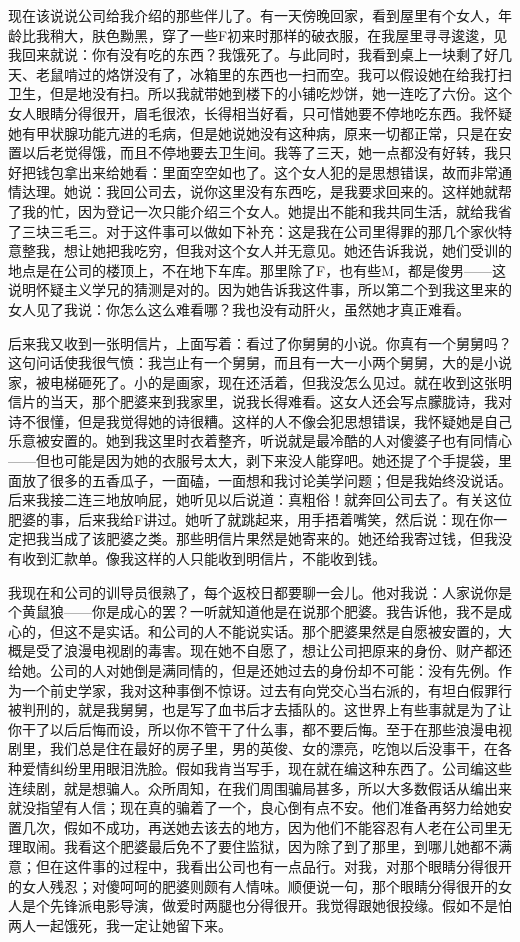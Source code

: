 现在该说说公司给我介绍的那些伴儿了。有一天傍晚回家，看到屋里有个女人，年龄比我稍大，肤色黝黑，穿了一些F初来时那样的破衣服，在我屋里寻寻逡逡，见我回来就说：你有没有吃的东西？我饿死了。与此同时，我看到桌上一块剩了好几天、老鼠啃过的烙饼没有了，冰箱里的东西也一扫而空。我可以假设她在给我打扫卫生，但是地没有扫。所以我就带她到楼下的小铺吃炒饼，她一连吃了六份。这个女人眼睛分得很开，眉毛很浓，长得相当好看，只可惜她要不停地吃东西。我怀疑她有甲状腺功能亢进的毛病，但是她说她没有这种病，原来一切都正常，只是在安置以后老觉得饿，而且不停地要去卫生间。我等了三天，她一点都没有好转，我只好把钱包拿出来给她看：里面空空如也了。这个女人犯的是思想错误，故而非常通情达理。她说：我回公司去，说你这里没有东西吃，是我要求回来的。这样她就帮了我的忙，因为登记一次只能介绍三个女人。她提出不能和我共同生活，就给我省了三块三毛三。对于这件事可以做如下补充：这是我在公司里得罪的那几个家伙特意整我，想让她把我吃穷，但我对这个女人并无意见。她还告诉我说，她们受训的地点是在公司的楼顶上，不在地下车库。那里除了F，也有些M，都是俊男——这说明怀疑主义学兄的猜测是对的。因为她告诉我这件事，所以第二个到我这里来的女人见了我说：你怎么这么难看哪？我也没有动肝火，虽然她才真正难看。 

后来我又收到一张明信片，上面写着：看过了你舅舅的小说。你真有一个舅舅吗？这句问话使我很气愤：我岂止有一个舅舅，而且有一大一小两个舅舅，大的是小说家，被电梯砸死了。小的是画家，现在还活着，但我没怎么见过。就在收到这张明信片的当天，那个肥婆来到我家里，说我长得难看。这女人还会写点朦胧诗，我对诗不很懂，但是我觉得她的诗很糟。这样的人不像会犯思想错误，我怀疑她是自己乐意被安置的。她到我这里时衣着整齐，听说就是最冷酷的人对傻婆子也有同情心——但也可能是因为她的衣服号太大，剥下来没人能穿吧。她还提了个手提袋，里面放了很多的五香瓜子，一面磕，一面想和我讨论美学问题；但是我始终没说话。后来我接二连三地放响屁，她听见以后说道：真粗俗！就奔回公司去了。有关这位肥婆的事，后来我给F讲过。她听了就跳起来，用手捂着嘴笑，然后说：现在你一定把我当成了该肥婆之类。那些明信片果然是她寄来的。她还给我寄过钱，但我没有收到汇款单。像我这样的人只能收到明信片，不能收到钱。 

我现在和公司的训导员很熟了，每个返校日都要聊一会儿。他对我说：人家说你是个黄鼠狼——你是成心的罢？一听就知道他是在说那个肥婆。我告诉他，我不是成心的，但这不是实话。和公司的人不能说实话。那个肥婆果然是自愿被安置的，大概是受了浪漫电视剧的毒害。现在她不自愿了，想让公司把原来的身份、财产都还给她。公司的人对她倒是满同情的，但是还她过去的身份却不可能：没有先例。作为一个前史学家，我对这种事倒不惊讶。过去有向党交心当右派的，有坦白假罪行被判刑的，就是我舅舅，也是写了血书后才去插队的。这世界上有些事就是为了让你干了以后后悔而设，所以你不管干了什么事，都不要后悔。至于在那些浪漫电视剧里，我们总是住在最好的房子里，男的英俊、女的漂亮，吃饱以后没事干，在各种爱情纠纷里用眼泪洗脸。假如我肯当写手，现在就在编这种东西了。公司编这些连续剧，就是想骗人。众所周知，在我们周围骗局甚多，所以大多数假话从编出来就没指望有人信；现在真的骗着了一个，良心倒有点不安。他们准备再努力给她安置几次，假如不成功，再送她去该去的地方，因为他们不能容忍有人老在公司里无理取闹。我看这个肥婆最后免不了要住监狱，因为除了到了那里，到哪儿她都不满意；但在这件事的过程中，我看出公司也有一点品行。对我，对那个眼睛分得很开的女人残忍；对傻呵呵的肥婆则颇有人情味。顺便说一句，那个眼睛分得很开的女人是个先锋派电影导演，做爱时两腿也分得很开。我觉得跟她很投缘。假如不是怕两人一起饿死，我一定让她留下来。 

